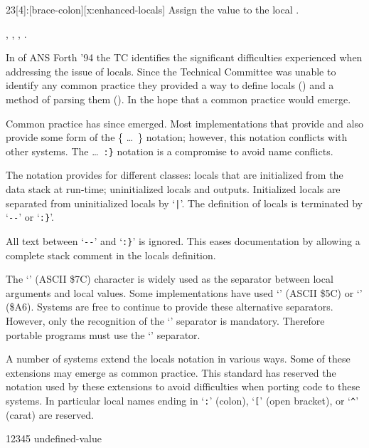 \begin{worddef}[b:]{23}[4]{\brace:}[brace-colon][x:enhanced-locals]
	Assign the value  to the local .

\see {},
	,
	,
	.

	\begin{rationale}
		In  of ANS Forth '94 the TC identifies the significant
		difficulties experienced when addressing the issue of locals. Since
		the Technical Committee was unable to identify any common practice
		they provided a way to define locals () and a
		method of parsing them (). In the hope that a
		common practice would emerge.

		Common practice has since emerged. Most implementations that provide
		 and  also provide some form of the
		\{ \ldots\ \} notation; however, this notation conflicts with other
		systems. The  \ldots\ \verb":}" notation is a compromise to
		avoid name conflicts.

		The notation provides for different classes: locals that are initialized
		from the data stack at run-time; uninitialized locals and outputs.
		Initialized locals are separated from uninitialized locals by `\verb"|"'.
		The definition of locals is terminated by `\verb"--"' or `\verb":}"'.

		All text between `\verb"--"' and `\verb":}"' is ignored.  This eases
		documentation by allowing a complete stack comment in the locals
		definition.

		The `\texttt{\textbar}' (ASCII \$7C) character is widely used as the
		separator between local arguments and local values. Some implementations
		have used `\texttt{\bs}' (ASCII \$5C) or `\texttt{\textbrokenbar}' (\$A6).
		Systems are free to continue to provide these alternative separators.
		However, only the recognition of the `\texttt{\textbar}' separator is
		mandatory. Therefore portable programs must use the `\texttt{\textbar}'
		separator.

		A number of systems extend the locals notation in various ways. Some
		of these extensions may emerge as common practice. This standard has
		reserved the notation used by these extensions to avoid difficulties
		when porting code to these systems. In particular local names ending
		in `\texttt{:}' (colon), `\texttt{[}' (open bracket), or
		`\texttt{\textasciicircum}' (carat) are reserved.
	\end{rationale}

	\begin{implement}
12345  undefined-value


\end{implement}
\end{worddef}
